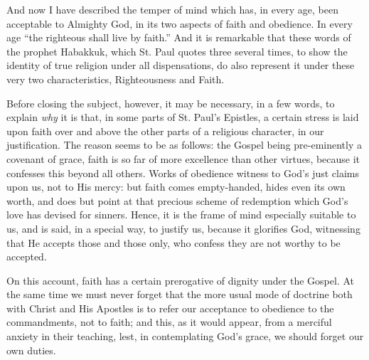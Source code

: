 And now I have described the temper of mind which has, in every
age, been acceptable to Almighty God, in its two aspects of faith and
obedience. In every age ``the righteous shall live by faith.''
And it is remarkable that these words of the prophet Habakkuk, which
St. Paul quotes three several times, to show the identity of true
religion under all dispensations, do also represent it under these
very two characteristics, Righteousness and Faith.

Before closing the subject, however, it may be necessary, in a few
words, to explain \emph{why} it is that, in some parts of St. Paul's
Epistles, a certain stress is laid upon faith over and above the other
parts of a religious character, in our justification. The reason seems
to be as follows: the Gospel being pre-eminently a covenant of grace,
faith is so far of more excellence than other virtues, because it
confesses this beyond all others. Works of obedience witness to God's
just claims upon us, not to His mercy: but faith comes empty-handed,
hides even its own worth, and does but point at that precious scheme
of redemption which God's love has devised for sinners. Hence, it is
the frame of mind especially suitable to us, and is said, in a special
way, to justify us, because it glorifies God, witnessing that He
accepts those and those only, who confess they are not worthy to be
accepted.

On this account, faith has a certain prerogative of dignity under
the Gospel. At the same time we must never forget that the more usual
mode of doctrine both with Christ and His Apostles is to refer our
acceptance to obedience to the commandments, not to faith; and this,
as it would appear, from a merciful anxiety in their teaching, lest,
in contemplating God's grace, we should forget our own duties.

